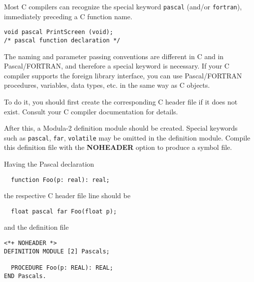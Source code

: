 Most C compilers can recognize the special keyword {\tt pascal}
(and/or {\tt fortran}), immediately preceding a C function name.

\begin{verbatim}
void pascal PrintScreen (void);
/* pascal function declaration */
\end{verbatim}

The naming and parameter passing conventions are different in
C and in {Pascal}/{FORTRAN}, and therefore a special keyword is necessary.
If your C compiler supports the foreign library interface, you can use
{Pascal}/{FORTRAN} procedures, variables, data types, etc. in the
same way as C objects.

To do it, you should first create the corresponding C header file if it
does not exist. Consult your C compiler documentation for details.

After this, a Modula-2 definition module should be created.
Special keywords such as {\tt pascal}, {\tt far}, {\tt volatile} may
be omitted in the definition module.
Compile this definition file with the {\bf NOHEADER}
option to produce a symbol file.

Having the Pascal declaration
\begin{verbatim}
  function Foo(p: real): real;
\end{verbatim}
the respective C header file line should be
\begin{verbatim}
  float pascal far Foo(float p);
\end{verbatim}

and the definition file
\begin{verbatim}
<*+ NOHEADER *>
DEFINITION MODULE [2] Pascals;

  PROCEDURE Foo(p: REAL): REAL;
END Pascals.
\end{verbatim}

\fi %
